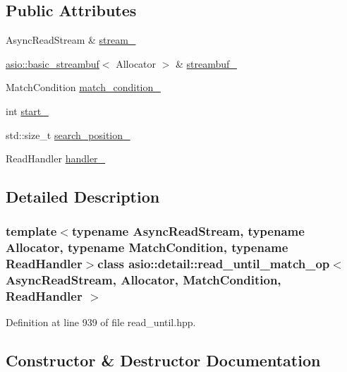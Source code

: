 \subsection*{Public Attributes}
\begin{DoxyCompactItemize}
\item 
Async\+Read\+Stream \& \hyperlink{classasio_1_1detail_1_1read__until__match__op_a4dd4e8d24de8028f6aafe609887913a9}{stream\+\_\+}
\item 
\hyperlink{classasio_1_1basic__streambuf}{asio\+::basic\+\_\+streambuf}$<$ Allocator $>$ \& \hyperlink{classasio_1_1detail_1_1read__until__match__op_aa4a3b07023c4e23029f57bd6667a8834}{streambuf\+\_\+}
\item 
Match\+Condition \hyperlink{classasio_1_1detail_1_1read__until__match__op_a070acf7946b3b92a8e16a4255e03049e}{match\+\_\+condition\+\_\+}
\item 
int \hyperlink{classasio_1_1detail_1_1read__until__match__op_a65742efa0b628e922efe3935b64c6c5f}{start\+\_\+}
\item 
std\+::size\+\_\+t \hyperlink{classasio_1_1detail_1_1read__until__match__op_a314bf10d03fcd41db2fc7ad6a43f0dce}{search\+\_\+position\+\_\+}
\item 
Read\+Handler \hyperlink{classasio_1_1detail_1_1read__until__match__op_a7e60b01ad7c7cd03d8291da54e8aec89}{handler\+\_\+}
\end{DoxyCompactItemize}


\subsection{Detailed Description}
\subsubsection*{template$<$typename Async\+Read\+Stream, typename Allocator, typename Match\+Condition, typename Read\+Handler$>$class asio\+::detail\+::read\+\_\+until\+\_\+match\+\_\+op$<$ Async\+Read\+Stream, Allocator, Match\+Condition, Read\+Handler $>$}



Definition at line 939 of file read\+\_\+until.\+hpp.



\subsection{Constructor \& Destructor Documentation}
\hypertarget{classasio_1_1detail_1_1read__until__match__op_a77d0200631728a1df9bb388df5f67a82}{}
